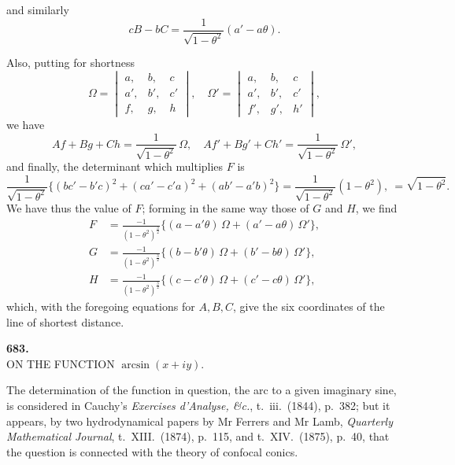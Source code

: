 \documentclass[11pt,a4paper]{article}
\begin{document}
and similarly
\[
cB - bC = \frac{1}{\sqrt{1 - \theta^{2}}}(a' - a\theta).
\]

Also, putting for shortness
\[
\Omega = \begin{vmatrix} a, & b, & c\\ a', & b', & c'\\ f, & g, & h\end{vmatrix},\quad \Omega' = \begin{vmatrix} a, & b, & c\\ a', & b', & c'\\ f', & g', & h'\end{vmatrix},
\]
we have
\[
Af + Bg + Ch = \frac{1}{\sqrt{1 - \theta^{2}}}\,\Omega,\quad Af' + Bg' + Ch' = \frac{1}{\sqrt{1 - \theta^{2}}}\,\Omega',
\]
and finally, the determinant which multiplies $F$ is
\[
\frac{1}{\sqrt{1 - \theta^{2}}}\{(bc' - b'c)^{2} + (ca' - c'a)^{2} + (ab' - a'b)^{2}\} = \frac{1}{\sqrt{1 - \theta^{2}}}(1 - \theta^{2}),\ = \sqrt{1 - \theta^{2}}.
\]
We have thus the value of $F$; forming in the same way those of $G$ and $H$, we find
\begin{align*}
F &= \frac{-1}{(1 - \theta^{2})^{\frac{3}{2}}}\{(a - a'\theta)\,\Omega + (a' - a\theta)\,\Omega'\},\\
G &= \frac{-1}{(1 - \theta^{2})^{\frac{3}{2}}}\{(b - b'\theta)\,\Omega + (b' - b\theta)\,\Omega'\},\\
H &= \frac{-1}{(1 - \theta^{2})^{\frac{3}{2}}}\{(c - c'\theta)\,\Omega + (c' - c\theta)\,\Omega'\},
\end{align*}
which, with the foregoing equations for $A, B, C$, give the six coordinates of the line of shortest distance.

\newpage



\begin{center}
\textbf{683.}\\[6pt]
\large ON THE FUNCTION $\arcsin(x + iy)$.
\end{center}

\medskip


\medskip

The determination of the function in question, the arc to a given imaginary sine, is considered in Cauchy's \emph{Exercises d'Analyse, \&c.}, t.~iii.\ (1844), p.~382; but it appears, by two hydrodynamical papers by Mr Ferrers and Mr Lamb, \emph{Quarterly Mathematical Journal}, t.~XIII.\ (1874), p.~115, and t.~XIV.\ (1875), p.~40, that the question is connected with the theory of confocal conics.
\end{document}
